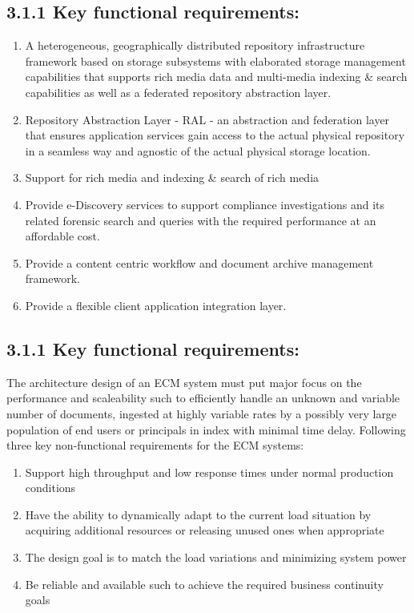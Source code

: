 \subsection{3.1.1	Key functional requirements:}
\begin{enumerate}
\item A heterogeneous, geographically distributed repository infrastructure framework based on storage subsystems with elaborated storage management capabilities that supports rich media data and multi-media indexing \& search capabilities as well as a federated repository abstraction layer. 
\item Repository Abstraction Layer - RAL - an abstraction and federation layer that ensures application services gain access to the actual physical repository in a seamless way and agnostic of the actual physical storage location.
\item Support for rich media and indexing \& search of rich media 
\item Provide e-Discovery services to support compliance investigations and its related forensic search and queries with the required performance at an affordable cost.
\item Provide a content centric workflow and document archive management framework. 
\item Provide a flexible client application integration layer.
\end{enumerate}

\subsection{3.1.1	Key functional requirements:}
The architecture design of an ECM system must put major focus on the performance and scaleability such to efficiently handle an unknown and variable number of documents, ingested at highly variable rates by a possibly very large population of end users or principals in index with minimal time delay. Following three key non-functional requirements for the ECM systems:


\begin{enumerate}
\item Support high throughput and low response times under normal production conditions  
\item Have the ability to dynamically adapt to the current load situation by acquiring additional resources or releasing unused ones when appropriate
\item The design goal is to match the load variations and minimizing system power
\item Be reliable and available such to achieve the required business continuity goals
\end{enumerate}





